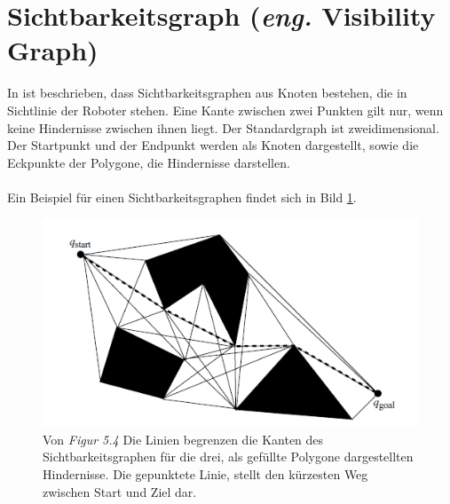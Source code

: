 \section{Sichtbarkeitsgraph (\textit{eng.} Visibility Graph)}
%
%
In \cite{Principles:05} ist beschrieben, dass Sichtbarkeitsgraphen aus Knoten bestehen, die in Sichtlinie der Roboter stehen. Eine Kante zwischen zwei Punkten gilt nur, wenn keine Hindernisse zwischen ihnen liegt. Der Standardgraph ist zweidimensional. Der Startpunkt und der Endpunkt werden als Knoten dargestellt, sowie die Eckpunkte der Polygone, die Hindernisse darstellen.
\\\\
Ein Beispiel für einen Sichtbarkeitsgraphen findet sich in Bild \ref{sec3a}.
\begin{figure} %
	\centering
	\includegraphics[width=\textwidth]{images/Robot_Motion_Visibility_Graph.png}
	\caption{Von \cite[~S. 111]{Principles:05} \textit{Figur 5.4} Die Linien begrenzen die Kanten des Sichtbarkeitsgraphen für die drei, als gefüllte Polygone dargestellten Hindernisse. Die gepunktete Linie, stellt den kürzesten Weg zwischen Start und Ziel dar.}
	\label{sec3a}
\end{figure}


